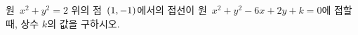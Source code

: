 원~$x^2+y^2=2$ 위의 점~$(1{,}\mkern3mu\mathopen{}-1)$에서의 접선이 원~$x^2+y^2-6x+2y+k=0$에 접할 때, 상수 $k$의 값을 구하시오. 
